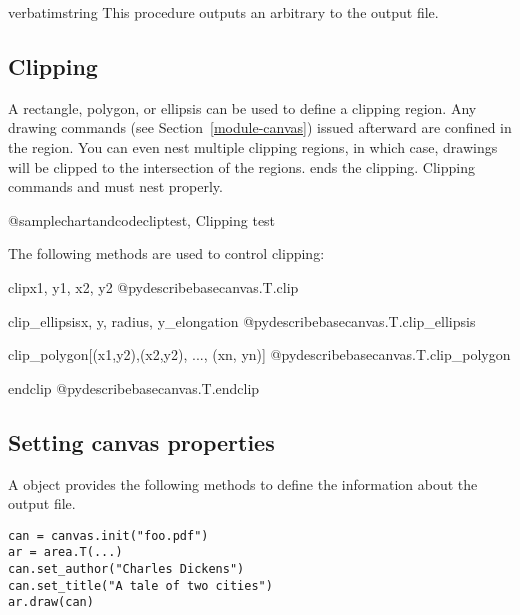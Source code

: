 \documentclass{howto}
\newcommand{\pxref}[1]{see Section~\ref{#1}}
\begin{document}
\begin{methoddesc}{verbatim}{string}
This procedure outputs an arbitrary  to the output file.
\end{methoddesc}

\subsection{Clipping}\label{clipping-canvas}

A rectangle, polygon, or ellipsis can be used to define a clipping
region.  Any drawing commands (\pxref{module-canvas}) issued afterward are
confined in the region. You can even nest multiple clipping regions,
in which case, drawings will be clipped to the intersection of the
regions.   ends the clipping. Clipping commands
and  must nest properly.

@samplechartandcode{cliptest, Clipping test}

The following  methods are used to control clipping:

\begin{methoddesc}{clip}{x1, y1, x2, y2}
@pydescribe{basecanvas.T.clip}
\end{methoddesc}

\begin{methoddesc}{clip_ellipsis}{x, y, radius, y_elongation}
@pydescribe{basecanvas.T.clip_ellipsis}
\end{methoddesc}

\begin{methoddesc}{clip_polygon}{[(x1,y2),(x2,y2), ..., (xn, yn)]}
@pydescribe{basecanvas.T.clip_polygon}
\end{methoddesc}

\begin{methoddesc}{endclip}{}
@pydescribe{basecanvas.T.endclip}
\end{methoddesc}

\subsection{Setting canvas properties}\label{property-canvas}

A  object provides the following methods to define the
information about the output file.

\begin{verbatim}
can = canvas.init("foo.pdf")
ar = area.T(...)
can.set_author("Charles Dickens")
can.set_title("A tale of two cities")
ar.draw(can)
\end{verbatim}
\end{document}
